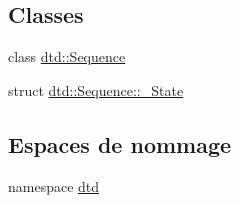 \subsection*{Classes}
\begin{DoxyCompactItemize}
\item 
class \hyperlink{classdtd_1_1_sequence}{dtd::Sequence}
\item 
struct \hyperlink{structdtd_1_1_sequence_1_1___state}{dtd::Sequence::\_\-State}
\end{DoxyCompactItemize}
\subsection*{Espaces de nommage}
\begin{DoxyCompactItemize}
\item 
namespace \hyperlink{namespacedtd}{dtd}
\end{DoxyCompactItemize}
